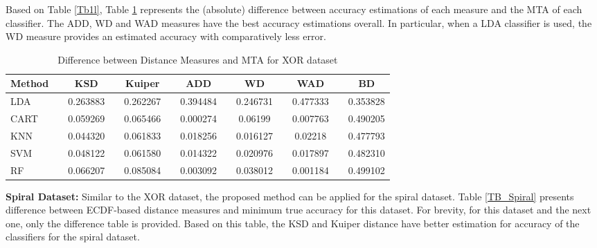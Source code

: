 \documentclass{article}
\begin{document}
Based on Table \ref{Tb1l}, Table \ref{TB_XOR} represents the (absolute) difference between accuracy estimations of each measure and the MTA of each classifier. The ADD, WD and WAD measures have the best accuracy estimations overall. In particular, when a LDA classifier is used, the WD measure provides an estimated accuracy with comparatively less error.

\begin{table}[htbp]
  \centering
  \caption{Difference between Distance Measures and MTA for XOR dataset}
    \begin{tabular}{lrcrcrcrcrcrr}
      \hline \hline
    Method   &          & KSD      &          & Kuiper  &          & ADD      &          & WD       &          & WAD      &          & \multicolumn{1}{c}{BD} \\
      \hline 
    LDA      &          & 0.263883 &          & 0.262267 &          & 0.394484 &          & 0.246731 &          & 0.477333 &          & 0.353828 \\
    CART     &          & 0.059269 &          & 0.065466 &          & 0.000274 &          & 0.06199  &          & 0.007763 &          & 0.490205 \\
    KNN      &          & 0.044320  &          & 0.061833 &          & 0.018256 &          & 0.016127 &          & 0.02218  &          & 0.477793 \\
    SVM      &          & 0.048122 &          & 0.061580  &          & 0.014322 &          & 0.020976 &          & 0.017897 &          & 0.482310 \\
    RF       &          & 0.066207 &          & 0.085084 &          & 0.003092 &          & 0.038012 &          & 0.001184 &          & 0.499102 \\
      \hline \hline
    \end{tabular}\label{TB_XOR}\end{table}

\textbf{Spiral Dataset:} Similar to the XOR dataset, the proposed method can be applied for the spiral dataset. Table \ref{TB_Spiral} presents difference between ECDF-based distance measures and minimum true accuracy for this dataset. For brevity, for this dataset and the next one, only the difference table is provided. Based on this table, the KSD and Kuiper distance have better estimation for accuracy of the classifiers for the spiral dataset. 
\end{document}
